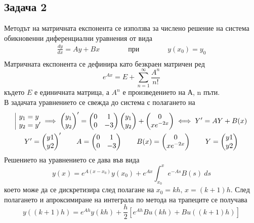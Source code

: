 \documentclass[a4paper,fleqn,12pt]{article}
\begin{document}
\subsection{Задача 2}
Методът на матричната експонента се използва за числено решение на система обикновенни диференциални уравнения от вида 
	\begin{gather*}
		\frac{dy}{dx} = Ay + Bx
		\qquad \qquad  \text{при} \qquad \qquad 
      		y(x_0)=y_0 \\
	\end{gather*}
Матричната експонента се дефинира като безкраен матричен ред
\begin{equation*}
	e^{Ax} = E + \sum_{n=1} ^{\infty} \frac{A^n}{n!}
\end{equation*}
където $E$ е единичната матрица, а $A^n$ е произведението на А, n пъти.\\
В задачата уравнението се свежда до система с полагането на 
	\begin{gather*}
		\begin{array}{|l@{}}
			y_1=y\\
			y_2=y'
		\end{array} \implies 
		\begin{pmatrix} y_1 \\ y_2 \end{pmatrix}' = 
		\begin{pmatrix} 0 & 1 \\ 0 & -3 \end{pmatrix} 
		\begin{pmatrix} y_1 \\ y_2 \end{pmatrix} + 
		\begin{pmatrix} 0 \\ xe^{-2x} \end{pmatrix} \iff Y'=AY+B(x)\\ 
		Y'=\begin{pmatrix} y1 \\ y2 \end{pmatrix}' \qquad 
		A=\begin{pmatrix} 0 & 1 \\ 0 & -3 \end{pmatrix} \qquad 
		B(x)=\begin{pmatrix} 0 \\ xe^{-2x} \end{pmatrix} \qquad
		Y=\begin{pmatrix} y1 \\ y2 \end{pmatrix}
	\end{gather*}
Решението на уравнението се дава във вида
\begin{equation*}
	y(x)=e^{A(x-x_0)} y(x_0) + e^{Ax} \int_{x_0} ^{x} e^{-As} B(s) \ ds
\end{equation*}
което може да се дискретизира след полагане на $x_0 = kh, \, x = (k+1)h$. След полагането и апроксимиране на 
интеграла по метода на трапеците се получава
\begin{equation*}
	y((k+1)h)= e^{Ah}y(kh) + \frac{h}{2} \left[ e^{Ah}Bu(kh) + Bu((k+1)h) \right]
\end{equation*}
\end{document}
